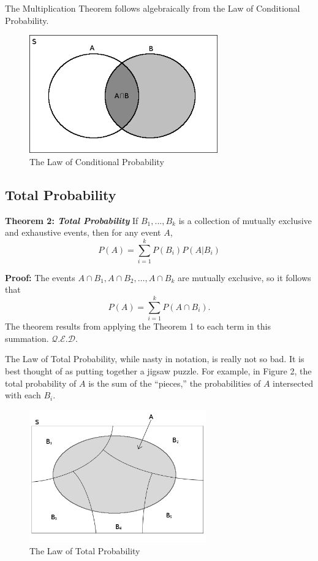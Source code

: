 \documentclass{article}
\newenvironment{proof} {\textbf{Proof:} \newline} {\hfill
  $\mathcal{Q.E.D.}$}
\newenvironment{thm}[2][]{\vspace{0.2cm} \textbf{Theorem #2:
    \textit{#1}} \newline}{}
\begin{document}
The Multiplication Theorem follows algebraically from the
Law of Conditional Probability.

\begin{figure}
\centering
\includegraphics[height=2in,
width=3.2in]{fig-1-conditional-probability.png}
\caption{The Law of Conditional Probability}
\end{figure}
  
\subsection{Total Probability}

\begin{thm}[Total Probability]{2}
  If $B_1, ..., B_k$ is a collection of mutually exclusive and
  exhaustive events, then for any event $A$, $$P(A) =
  \sum_{i=1}^k P(B_i)P(A|B_i)$$
\end{thm}

\begin{proof}
  The events $A \cap B_1, A \cap B_2, \ldots, A \cap B_k$
  are mutually exclusive, so it follows that $$P(A) =
  \sum_{i=1}^k P(A \cap B_i).$$ The theorem results from
  applying the Theorem 1 to each term in this summation.
\end{proof}

The Law of Total Probability, while nasty in notation, is
really not so bad. It is best thought of as putting together
a jigsaw puzzle. For example, in Figure 2, the total
probability of $A$ is the sum of the ``pieces,'' the
probabilities of $A$ intersected with each $B_i$.

\begin{figure}
\centering
\includegraphics[width=3in,
height=2.25in]{fig-2-total-probability.png}
\caption{The Law of Total Probability}
\end{figure}
\end{document}
